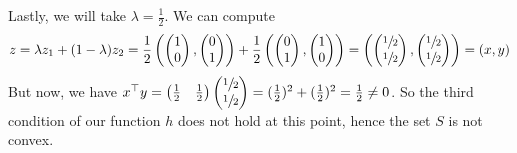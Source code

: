 \documentclass{article}
\newcommand{\tp}{^\top}
\begin{document}
Lastly, we will take $\lambda=\frac{1}{2}$. We can compute 
$$
z=\lambda z_1 + (1-\lambda) z_2
=\frac{1}{2}
\left(
	\begin{pmatrix} 1\\ 0\end{pmatrix},
	\begin{pmatrix} 0\\ 1\end{pmatrix}
\right)
+\frac{1}{2}
\left(
	\begin{pmatrix} 0\\ 1\end{pmatrix},
	\begin{pmatrix} 1\\ 0\end{pmatrix}
\right)
=
\left(
	\begin{pmatrix} \sfrac{1}{2}\\ \sfrac{1}{2}\end{pmatrix},
	\begin{pmatrix} \sfrac{1}{2}\\ \sfrac{1}{2}\end{pmatrix}
\right)
=(x,y)$$
But now, we have $x\tp y=
\begin{pmatrix} \frac{1}{2}& \frac{1}{2}\end{pmatrix}
\begin{pmatrix} \sfrac{1}{2}\\ \sfrac{1}{2}\end{pmatrix}
=(\frac{1}{2})^2+(\frac{1}{2})^2=\frac{1}{2} \neq 0$. So the third condition of our function $h$ does not hold at this point, hence the set $S$ is not convex.\\
\end{document}

